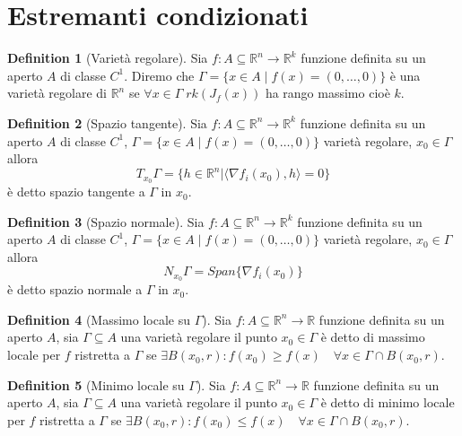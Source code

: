 \documentclass[leqno]{article}
\theoremstyle{definition}
\newtheorem{definition}{Definition}[section]
\numberwithin{equation}{section}
\theoremstyle{remark}
\begin{document}
	\section{Estremanti condizionati}
	\begin{definition}[Varietà regolare]
		Sia $f:A\subseteq \mathbb{R}^n \rightarrow \mathbb{R}^{k}$ funzione definita su un aperto $A$ di classe $C^1$. Diremo che $\Gamma=\{ x \in A \; | \; f(x)=(0,\dots,0)\}$ è una varietà regolare di $\mathbb{R}^n$ se $\forall x \in \Gamma \; rk(J_f(x))$ ha rango massimo cioè $k$.
	\end{definition}
	\begin{definition}[Spazio tangente]
		Sia $f:A\subseteq \mathbb{R}^n \rightarrow \mathbb{R}^{k}$ funzione definita su un aperto $A$ di classe $C^1$, $\Gamma=\{ x \in A \; | \; f(x)=(0,\dots,0)\}$ varietà regolare, $x_0\in \Gamma$ allora
		\begin{equation}
			T_{x_0}\Gamma=\{h\in \mathbb{R}^n | \langle \nabla f_i(x_0), h \rangle = 0\}
		\end{equation}
		è detto spazio tangente a $\Gamma$ in $x_0$.
	\end{definition}
	\begin{definition}[Spazio normale]
		Sia $f:A\subseteq \mathbb{R}^n \rightarrow \mathbb{R}^{k}$ funzione definita su un aperto $A$ di classe $C^1$, $\Gamma=\{ x \in A \; | \; f(x)=(0,\dots,0)\}$ varietà regolare, $x_0\in \Gamma$ allora
		\begin{equation}
			N_{x_0}\Gamma=Span\{\nabla f_i (x_0)\}
		\end{equation}
		è detto spazio normale a $\Gamma$ in $x_0$.
	\end{definition}
	\begin{definition}[Massimo locale su $\Gamma$]
		Sia $f:A\subseteq \mathbb{R}^n \rightarrow \mathbb{R}$ funzione definita su un aperto $A$, sia $\Gamma \subseteq A$ una varietà regolare il punto $x_0 \in \Gamma$ è detto di massimo locale per $f$ ristretta a $\Gamma$ se $\exists B(x_0,r) : f(x_0)\ge f(x) \quad \forall x \in \Gamma \cap B(x_0,r)$.
	\end{definition}
	\begin{definition}[Minimo locale su $\Gamma$]
		Sia $f:A\subseteq \mathbb{R}^n \rightarrow \mathbb{R}$ funzione definita su un aperto $A$, sia $\Gamma \subseteq A$ una varietà regolare il punto $x_0 \in \Gamma$ è detto di minimo locale per $f$ ristretta a $\Gamma$ se $\exists B(x_0,r) : f(x_0)\le f(x) \quad \forall x \in \Gamma \cap B(x_0,r)$.
	\end{definition}
\end{document}

